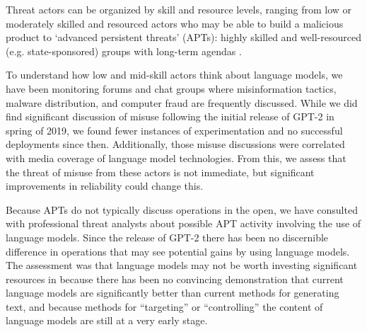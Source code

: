 Threat actors can be organized by skill and resource levels, ranging from low or moderately skilled and resourced actors who may be able to build a malicious product to `advanced persistent threats' (APTs): highly skilled and well-resourced (e.g. state-sponsored) groups with long-term agendas \cite{solaiman2019release}.

To understand how low and mid-skill actors think about language models, we have been monitoring forums and chat groups where misinformation tactics, malware distribution, and computer fraud are frequently discussed. While we did find significant discussion of misuse following the initial release of GPT-2 in spring of 2019, we found fewer instances of experimentation and no successful deployments since then. Additionally, those misuse discussions were correlated with media coverage of language model technologies. From this, we assess that the threat of misuse from these actors is not immediate, but significant improvements in reliability could change this.

Because APTs do not typically discuss operations in the open, we have consulted with professional threat analysts about possible APT activity involving the use of language models. Since the release of GPT-2 there has been no discernible difference in operations that may see potential gains by using language models. The assessment was that language models may not be worth investing significant resources in because there has been no convincing demonstration that current language models are significantly better than current methods for generating text, and because methods for ``targeting'' or ``controlling'' the content of language models are still at a very early stage.


